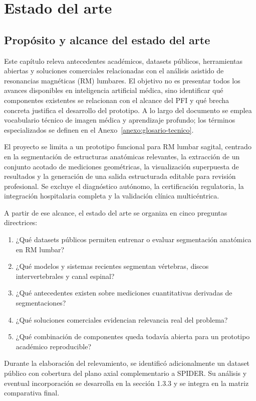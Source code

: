\chapter{Estado del arte}

\section{Propósito y alcance del estado del arte}

Este capítulo releva antecedentes académicos, datasets públicos, herramientas abiertas y soluciones comerciales relacionadas con el análisis asistido de resonancias magnéticas (RM) lumbares. El objetivo no es presentar todos los avances disponibles en inteligencia artificial médica, sino identificar qué componentes existentes se relacionan con el alcance del PFI y qué brecha concreta justifica el desarrollo del prototipo. A lo largo del documento se emplea vocabulario técnico de imagen médica y aprendizaje profundo; los términos especializados se definen en el Anexo~\ref{anexo:glosario-tecnico}.

El proyecto se limita a un prototipo funcional para RM lumbar sagital, centrado en la segmentación de estructuras anatómicas relevantes, la extracción de un conjunto acotado de mediciones geométricas, la visualización superpuesta de resultados y la generación de una salida estructurada editable para revisión profesional. Se excluye el diagnóstico autónomo, la certificación regulatoria, la integración hospitalaria completa y la validación clínica multicéntrica.

A partir de ese alcance, el estado del arte se organiza en cinco preguntas directrices:

\begin{enumerate}
    \item ¿Qué datasets públicos permiten entrenar o evaluar segmentación anatómica en RM lumbar?
    \item ¿Qué modelos y sistemas recientes segmentan vértebras, discos intervertebrales y canal espinal?
    \item ¿Qué antecedentes existen sobre mediciones cuantitativas derivadas de segmentaciones?
    \item ¿Qué soluciones comerciales evidencian relevancia real del problema?
    \item ¿Qué combinación de componentes queda todavía abierta para un prototipo académico reproducible?
\end{enumerate}

Durante la elaboración del relevamiento, se identificó adicionalmente un dataset público con cobertura del plano axial complementario a SPIDER. Su análisis y eventual incorporación se desarrolla en la sección 1.3.3 y se integra en la matriz comparativa final.

